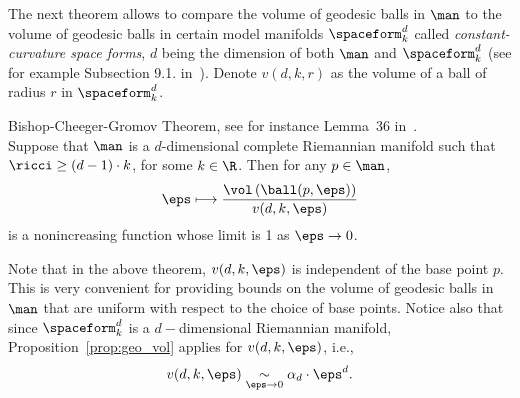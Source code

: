 The next theorem allows to compare the volume of geodesic balls in $\man$ to the volume of geodesic balls in certain model manifolds $\spaceform^d_k$ called {\it constant-curvature space forms}, $d$ being the dimension of both $\man$ and $\spaceform^d_k$ (see for example Subsection 9.1. in~\cite{petersen2006riemannian}).
Denote $v(d,k,r)$ as the volume of a ball of radius $r$ in $\spaceform^d_k$. 

\begin{theorem}{Bishop-Cheeger-Gromov Theorem, see for instance Lemma~36 in~\cite{petersen2006riemannian}.}\\
\label{thm:bishop_gromov}
Suppose that $\man$ is a $d$-dimensional complete Riemannian manifold such that $\ricci\geq(d-1)\cdot k$, for some $k \in \R$. Then  for any $p \in \man$, 
$$\eps\longmapsto\frac{\vol\left(\ball(p,\eps)\right)}{v(d,k,\eps)} $$
is a nonincreasing function whose limit is 1 as $\eps\rightarrow 0$. 
\end{theorem}
 
Note that in the above theorem, $v(d,k,\eps)$ is independent of the base point $p$. %
This is very convenient for providing bounds on the volume of geodesic balls in $\man$ that are uniform with respect to the choice of base points. Notice also that since $\spaceform^d_k$ is a $d-$dimensional Riemannian manifold, Proposition~\ref{prop:geo_vol} applies for $v(d,k,\eps)$, i.e.,
$$v(d,k,\eps)\underset{\eps\rightarrow 0}{\sim} \alpha_d\cdot \eps^d.$$

